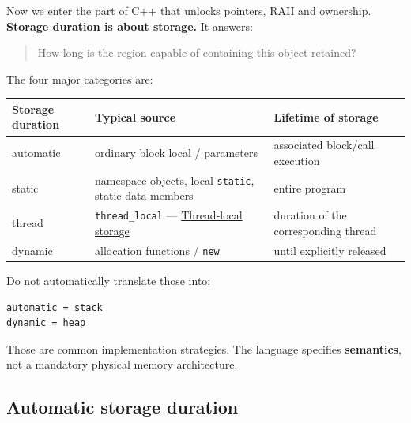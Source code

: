 Now we enter the part of C++ that unlocks pointers, RAII and ownership. \textbf{Storage duration is about storage.} It answers:

\begin{quote}
How long is the region capable of containing this object retained?
\end{quote}

The four major categories are:

{\def\LTcaptype{none} %
\begin{longtable}[]{@{}
  >{\raggedright\arraybackslash}p{}
  >{\raggedright\arraybackslash}p{}
  >{\raggedright\arraybackslash}p{}@{}}
\toprule\noalign{}
\begin{minipage}[b]{\linewidth}\raggedright
Storage duration
\end{minipage} & \begin{minipage}[b]{\linewidth}\raggedright
Typical source
\end{minipage} & \begin{minipage}[b]{\linewidth}\raggedright
Lifetime of storage
\end{minipage} \\
\midrule\noalign{}
\endhead
\bottomrule\noalign{}
\endlastfoot
automatic & ordinary block local / parameters & associated block/call execution \\
static & namespace objects, local \texttt{static}, static data members & entire program \\
thread & \texttt{thread\_local} --- \hyperref[appendix-3b88c6cd7195]{Thread-local storage} & duration of the corresponding thread \\
dynamic & allocation functions / \texttt{new} & until explicitly released \\
\end{longtable}
}

Do not automatically translate those into:

\begin{verbatim}
automatic = stack
dynamic = heap
\end{verbatim}

Those are common implementation strategies. The language specifies \textbf{semantics}, not a mandatory physical memory architecture.

\subsection{Automatic storage duration}\label{01-foundations-i-ch002-automatic-storage-duration}

